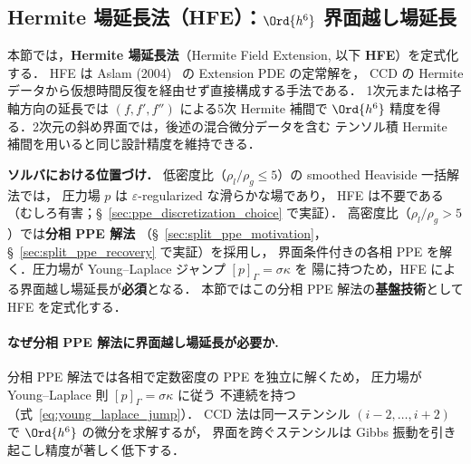 %
%
\subsection{\texorpdfstring{Hermite 場延長法（HFE）：$\Ord{h^6}$ 界面越し場延長}{Hermite 場延長法（HFE）：O(h⁶) 界面越し場延長}}
\label{sec:field_extension}
\label{sec:hfe}%
\label{sec:extension_pde}%
\label{sec:gfm}%

本節では，\textbf{Hermite 場延長法}（Hermite Field Extension, 以下 \textbf{HFE}）を定式化する．
HFE は Aslam (2004)~\cite{Aslam2004} の Extension PDE の定常解を，
CCD の Hermite データから仮想時間反復を経由せず直接構成する手法である．
1次元または格子軸方向の延長では $(f, f', f'')$ による5次 Hermite 補間で
$\Ord{h^6}$ 精度を得る．2次元の斜め界面では，後述の混合微分データを含む
テンソル積 Hermite 補間を用いると同じ設計精度を維持できる．

\noindent\textbf{ソルバにおける位置づけ．}
低密度比（$\rho_l/\rho_g \leq 5$）の smoothed Heaviside 一括解法では，
圧力場 $p$ は $\varepsilon$-regularized な滑らかな場であり，
HFE は不要である（むしろ有害；§~\ref{sec:ppe_discretization_choice} で実証）．
高密度比（$\rho_l/\rho_g > 5$）では\textbf{分相 PPE 解法}
（§~\ref{sec:split_ppe_motivation}，§~\ref{sec:split_ppe_recovery} で実証）を採用し，
界面条件付きの各相 PPE を解く．圧力場が Young--Laplace ジャンプ $[p]_\Gamma = \sigma\kappa$ を
陽に持つため，HFE による界面越し場延長が\textbf{必須}となる．
本節ではこの分相 PPE 解法の\textbf{基盤技術}として HFE を定式化する．

\paragraph{なぜ分相 PPE 解法に界面越し場延長が必要か.}
分相 PPE 解法では各相で定数密度の PPE を独立に解くため，
圧力場が Young--Laplace 則 $[p]_\Gamma = \sigma\kappa$ に従う
不連続を持つ（式~\eqref{eq:young_laplace_jump}）．
CCD 法は同一ステンシル $(i-2,\ldots,i+2)$ で $\Ord{h^6}$ の微分を求解するが，
界面を跨ぐステンシルは Gibbs 振動を引き起こし精度が著しく低下する．

